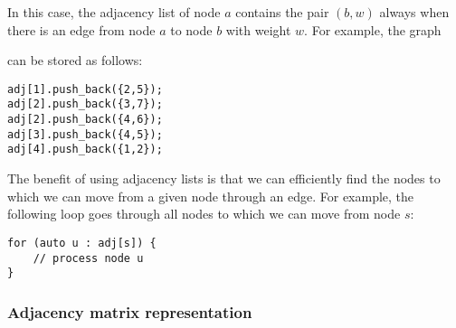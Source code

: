 In this case, the adjacency list of node $a$
contains the pair $(b,w)$
always when there is an edge from node $a$ to node $b$
with weight $w$. For example, the graph

\begin{center}
\end{center}
can be stored as follows:
\begin{lstlisting}
adj[1].push_back({2,5});
adj[2].push_back({3,7});
adj[2].push_back({4,6});
adj[3].push_back({4,5});
adj[4].push_back({1,2});
\end{lstlisting}

The benefit of using adjacency lists is that
we can efficiently find the nodes to which
we can move from a given node through an edge.
For example, the following loop goes through all nodes
to which we can move from node $s$:

\begin{lstlisting}
for (auto u : adj[s]) {
    // process node u
}
\end{lstlisting}

\subsubsection{Adjacency matrix representation}


